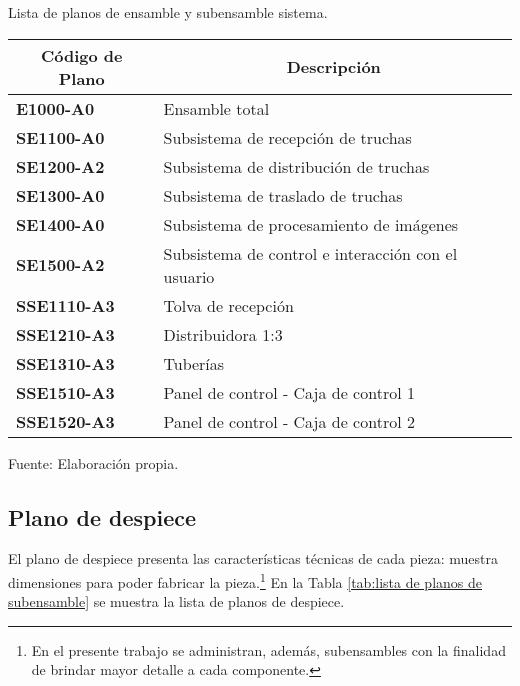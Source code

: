 \begin{mytable}[H]
	\footnotesize\centering
	\caption{Lista de planos de ensamble y subensamble sistema.}
	\label{tab:lista de planos de ensamble y subensamble}
	\begin{tabular}{|l|l|}
		\hline
		\multicolumn{1}{|c|}{\textbf{Código de Plano}} & \multicolumn{1}{c|}{\textbf{Descripción}} \\ \hline
		\textbf{E1000-A0}         & Ensamble total  \\ \hline
		\textbf{SE1100-A0}        & Subsistema de recepción de truchas  \\ \hline
		\textbf{SE1200-A2}        & Subsistema de distribución de truchas \\ \hline
		\textbf{SE1300-A0}        & Subsistema de traslado de truchas \\ \hline
		\textbf{SE1400-A0}        & Subsistema de procesamiento de imágenes \\ \hline
		\textbf{SE1500-A2}        & Subsistema de control e interacción con el usuario\\ \hline
		\textbf{SSE1110-A3}        & Tolva de recepción \\ \hline
		\textbf{SSE1210-A3}        & Distribuidora 1:3 \\ \hline
		\textbf{SSE1310-A3}        & Tuberías \\ \hline 
		\textbf{SSE1510-A3}        & Panel de control - Caja de control 1\\ \hline
		\textbf{SSE1520-A3}        & Panel de control - Caja de control 2\\ \hline
	\end{tabular}
	\begin{myflushcenteraftertable}	
		Fuente: Elaboración propia.
	\end{myflushcenteraftertable}
\end{mytable}

\vspace{-2.0 em}
\subsection{Plano de despiece}

El plano de despiece presenta las características técnicas de cada pieza: muestra dimensiones para poder fabricar la pieza.\footnote{En el presente trabajo se administran, además, subensambles con la finalidad de brindar mayor detalle a cada componente.} En la Tabla \ref{tab:lista de planos de subensamble} se muestra la lista de planos de despiece. 

